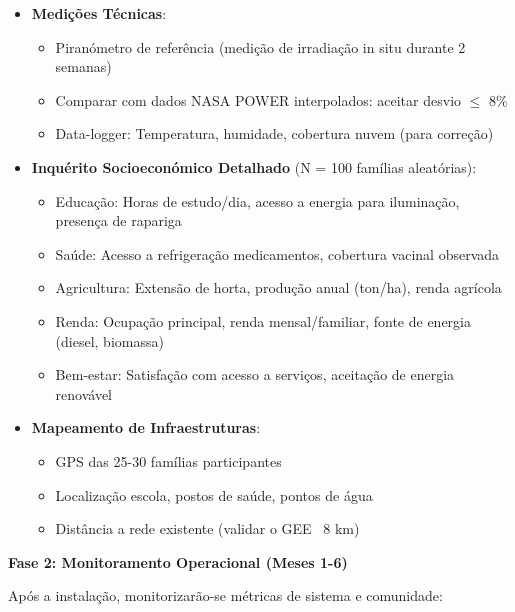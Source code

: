 \documentclass[12pt, a4paper]{article}
\begin{document}
\begin{itemize}
\item \textbf{Medições Técnicas}:
  \begin{itemize}
  \item Piranómetro de referência (medição de irradiação in situ durante 2 semanas)
  \item Comparar com dados NASA POWER interpolados: aceitar desvio \(\leq\) 8\%
  \item Data-logger: Temperatura, humidade, cobertura nuvem (para correção)
  \end{itemize}

\item \textbf{Inquérito Socioeconómico Detalhado} (N = 100 famílias aleatórias):
  \begin{itemize}
  \item Educação: Horas de estudo/dia, acesso a energia para iluminação, presença de rapariga
  \item Saúde: Acesso a refrigeração medicamentos, cobertura vacinal observada
  \item Agricultura: Extensão de horta, produção anual (ton/ha), renda agrícola
  \item Renda: Ocupação principal, renda mensal/familiar, fonte de energia (diesel, biomassa)
  \item Bem-estar: Satisfação com acesso a serviços, aceitação de energia renovável
  \end{itemize}

\item \textbf{Mapeamento de Infraestruturas}:
  \begin{itemize}
  \item GPS das 25-30 famílias participantes
  \item Localização escola, postos de saúde, pontos de água
  \item Distância a rede existente (validar o GEE ~8 km)
  \end{itemize}
\end{itemize}

\textbf{Fase 2: Monitoramento Operacional (Meses 1-6)}

Após a instalação, monitorizarão-se métricas de sistema e comunidade:
\end{document}
